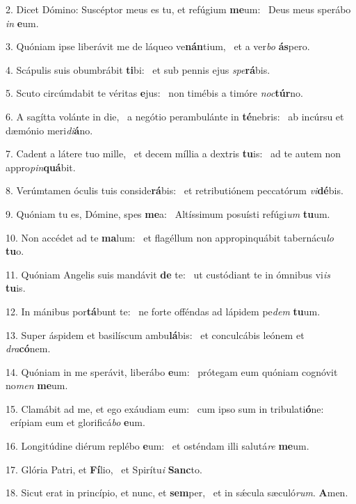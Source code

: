 2. Dicet Dómino: Suscéptor meus es tu, et refúgium \textbf{me}um: \ast\  Deus meus sperábo \textit{in} \textbf{e}um.\

3. Quóniam ipse liberávit me de láqueo ve\textbf{nán}tium, \ast\  et a ver\textit{bo} \textbf{ás}pero.\

4. Scápulis suis obumbrábit \textbf{ti}bi: \ast\  et sub pennis ejus \textit{spe}\textbf{rá}bis.\

5. Scuto circúmdabit te véritas \textbf{e}jus: \ast\  non timébis a timóre \textit{noc}\textbf{túr}no.\

6. A sagítta volánte in die, \dag\  a negótio perambulánte in \textbf{té}nebris: \ast\  ab incúrsu et dæmónio meri\textit{di}\textbf{á}no.\

7. Cadent a látere tuo mille, \dag\  et decem míllia a dextris \textbf{tu}is: \ast\  ad te autem non appro\textit{pin}\textbf{quá}bit.\

8. Verúmtamen óculis tuis conside\textbf{rá}bis: \ast\  et retributiónem peccatórum \textit{vi}\textbf{dé}bis.\

9. Quóniam tu es, Dómine, spes \textbf{me}a: \ast\  Altíssimum posuísti refúgi\textit{um} \textbf{tu}um.\

10. Non accédet ad te \textbf{ma}lum: \ast\  et flagéllum non appropinquábit tabernácu\textit{lo} \textbf{tu}o.\

11. Quóniam Angelis suis mandávit \textbf{de} te: \ast\  ut custódiant te in ómnibus vi\textit{is} \textbf{tu}is.\

12. In mánibus por\textbf{tá}bunt te: \ast\  ne forte offéndas ad lápidem pe\textit{dem} \textbf{tu}um.\

13. Super áspidem et basilíscum ambu\textbf{lá}bis: \ast\  et conculcábis leónem et \textit{dra}\textbf{có}nem.\

14. Quóniam in me sperávit, liberábo \textbf{e}um: \ast\  prótegam eum quóniam cognóvit no\textit{men} \textbf{me}um.\

15. Clamábit ad me, et ego exáudiam eum: \dag\  cum ipso sum in tribulati\textbf{ó}ne: \ast\  erípiam eum et glorificá\textit{bo} \textbf{e}um.\

16. Longitúdine diérum replébo \textbf{e}um: \ast\  et osténdam illi salutá\textit{re} \textbf{me}um.\

17. Glória Patri, et \textbf{Fí}lio, \ast\  et Spirítu\textit{i} \textbf{Sanc}to.\

18. Sicut erat in princípio, et nunc, et \textbf{sem}per, \ast\  et in sǽcula sæculó\textit{rum}. \textbf{A}men.\

